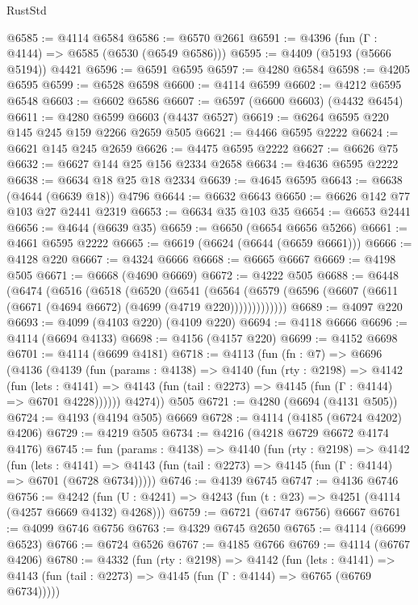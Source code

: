\begin{lexlean}{RustStd}
\begin{coremodule}
{\begin{coremodule}
{{{{{{{{{{{{{{@6585 := @4114 @6584
@6586 := @6570 @2661
@6591 := @4396 (fun (Γ : @4144) => @6585 (@6530 (@6549 @6586)))
@6595 := @4409 (@5193 (@5666 @5194)) @4421
@6596 := @6591 @6595
@6597 := @4280 @6584
@6598 := @4205 @6595
@6599 := @6528 @6598
@6600 := @4114 @6599
@6602 := @4212 @6595 @6548
@6603 := @6602 @6586
@6607 := @6597 (@6600 @6603) (@4432 @6454)
@6611 := @4280 @6599 @6603 (@4437 @6527)
@6619 := @6264 @6595 @220 @145 @245 @159 @2266 @2659 @505
@6621 := @4466 @6595 @2222
@6624 := @6621 @145 @245 @2659
@6626 := @4475 @6595 @2222
@6627 := @6626 @75
@6632 := @6627 @144 @25 @156 @2334 @2658
@6634 := @4636 @6595 @2222
@6638 := @6634 @18 @25 @18 @2334
@6639 := @4645 @6595
@6643 := @6638 (@4644 (@6639 @18)) @4796
@6644 := @6632 @6643
@6650 := @6626 @142 @77 @103 @27 @2441 @2319
@6653 := @6634 @35 @103 @35
@6654 := @6653 @2441
@6656 := @4644 (@6639 @35)
@6659 := @6650 (@6654 @6656 @5266)
@6661 := @4661 @6595 @2222
@6665 := @6619 (@6624 (@6644 (@6659 @6661)))
@6666 := @4128 @220
@6667 := @4324 @6666
@6668 := @6665 @6667
@6669 := @4198 @505
@6671 := @6668 (@4690 @6669)
@6672 := @4222 @505
@6688 := @6448
    (@6474
      (@6516
        (@6518
          (@6520
            (@6541
              (@6564
                (@6579 (@6596 (@6607 (@6611 (@6671 (@4694 @6672) (@4699 (@4719 @220)))))))))))))
@6689 := @4097 @220
@6693 := @4099 (@4103 @220) (@4109 @220)
@6694 := @4118 @6666
@6696 := @4114 (@6694 @4133)
@6698 := @4156 (@4157 @220)
@6699 := @4152 @6698
@6701 := @4114 (@6699 @4181)
@6718 := @4113
    (fun (fn : @7) =>
    @6696
      (@4136
        (@4139
          (fun (params : @4138) =>
          @4140
            (fun (rty : @2198) =>
            @4142
              (fun (lets : @4141) =>
              @4143 (fun (tail : @2273) => @4145 (fun (Γ : @4144) => @6701 @4228))))))
        @4274))
    @505
@6721 := @4280 (@6694 (@4131 @505))
@6724 := @4193 (@4194 @505) @6669
@6728 := @4114 (@4185 (@6724 @4202) @4206)
@6729 := @4219 @505
@6734 := @4216 (@4218 @6729 @6672 @4174 @4176)
@6745 := fun (params : @4138) =>
  @4140
    (fun (rty : @2198) =>
    @4142
      (fun (lets : @4141) =>
      @4143 (fun (tail : @2273) => @4145 (fun (Γ : @4144) => @6701 (@6728 @6734)))))
@6746 := @4139 @6745
@6747 := @4136 @6746
@6756 := @4242 (fun (U : @4241) => @4243 (fun (t : @23) => @4251 (@4114 (@4257 @6669 @4132) @4268)))
@6759 := @6721 (@6747 @6756) @6667
@6761 := @4099 @6746 @6756
@6763 := @4329 @6745 @2650
@6765 := @4114 (@6699 @6523)
@6766 := @6724 @6526
@6767 := @4185 @6766
@6769 := @4114 (@6767 @4206)
@6780 := @4332
    (fun (rty : @2198) =>
    @4142
      (fun (lets : @4141) =>
      @4143 (fun (tail : @2273) => @4145 (fun (Γ : @4144) => @6765 (@6769 @6734)))))
}}}}}}}}}}}}}}
\end{coremodule}}
\end{coremodule}
\end{lexlean}

